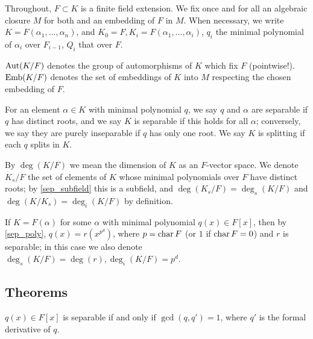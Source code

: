 Throughout, $F \subset K$ is a finite field extension.  We fix once and for
all an algebraic closure $M$ for both and an embedding of $F$ in $M$.  When
necessary, we write $K = F(\alpha_1, \dots, \alpha_n)$, and $K_0 = F, K_i =
F(\alpha_1, \dots, \alpha_i)$, $q_i$ the minimal polynomial of $\alpha_i$ over
$F_{i - 1}$, $Q_i$ that over $F$.

\begin{definition} $\operatorname{\text{Aut}}(K/F)$ denotes the group of automorphisms of $K$ which fix
$F$ (pointwise!).  $\operatorname{\text{Emb}}(K/F)$ denotes the set of embeddings of $K$ into $M$
respecting the chosen embedding of $F$.
\label{def:gal}
\end{definition}

\begin{definition} For an element $\alpha \in K$ with minimal polynomial $q$, we say
$q$ and $\alpha$ are separable if $q$ has distinct roots, and we say $K$ is
separable if this holds for all $\alpha$; conversely, we say they are purely
inseparable if $q$ has only one root.  We say $K$ is splitting if each $q$
splits in $K$.
\label{def:sepsplit}
\end{definition}

\begin{definition} By $\deg(K/F)$ we mean the dimension of $K$ as an $F$-vector
space.  We denote $K_s/F$ the set of elements of $K$ whose minimal polynomials
over $F$ have distinct roots; by \ref{sep_subfield} this is a subfield, and
$\deg(K_s/F) = \deg_s(K/F)$ and $\deg(K/K_s) = \deg_i(K/F)$ by definition.
\label{def:sep}
\end{definition}

\begin{definition} If $K = F(\alpha)$ for some $\alpha$ with minimal polynomial
$q(x) \in F[x]$, then by \ref{sep_poly}, $q(x) = r(x^{p^d})$, where $p =
\operatorname{\text{char}}{F}$ (or $1$ if $\operatorname{\text{char}}{F} = 0$) and $r$ is separable; in this case we
also denote $\deg_s(K/F) = \deg(r), \deg_i(K/F) = p^d$.  \label{def:prim_sep}
\end{definition}

\subsection{Theorems}

\begin{lemma} $q(x) \in F[x]$ is separable if and only if $\gcd(q, q') = 1$,
where $q'$ is the formal derivative of $q$. 
\label{der_poly}
\end{lemma}

